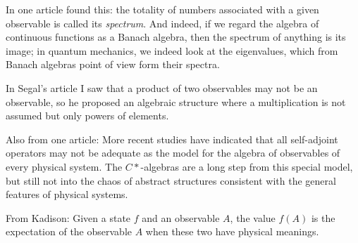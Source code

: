 In one article found this: the totality of numbers associated with a given observable is called its \emph{spectrum}. And indeed, if we regard the algebra of continuous functions as a Banach algebra, then the spectrum of anything is its image; in quantum mechanics, we indeed look at the eigenvalues, which from Banach algebras point of view form their spectra.

In Segal's article I saw that a product of two observables may not be an observable, so he proposed an algebraic structure where a multiplication is not assumed but only powers of elements.

Also from one article:
More recent studies have indicated that all self-adjoint operators may not be adequate as the model for the algebra of observables of every physical system. The $C*$-algebras are a long step from this special model, but still not into the chaos of abstract structures consistent with the general features of physical systems. 

From Kadison:
Given a state $f$ and an observable $A$, the value $f(A)$ is the expectation of the observable $A$ when these two have physical meanings.